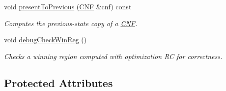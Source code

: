 \begin{DoxyCompactItemize}
void \hyperlink{classLearnSynthSAT_a1062ed5d0994b4fb1453285811d69f53}{present\-To\-Previous} (\hyperlink{classCNF}{C\-N\-F} \&cnf) const 
\begin{DoxyCompactList}\small\item\em Computes the previous-\/state copy of a \hyperlink{classCNF}{C\-N\-F}. \end{DoxyCompactList}\item 
void \hyperlink{classLearnSynthSAT_a83be7c843ad7ffb8a15a377b2227c891}{debug\-Check\-Win\-Reg} ()
\begin{DoxyCompactList}\small\item\em Checks a winning region computed with optimization R\-C for correctness. \end{DoxyCompactList}\end{DoxyCompactItemize}
\subsection*{Protected Attributes}
